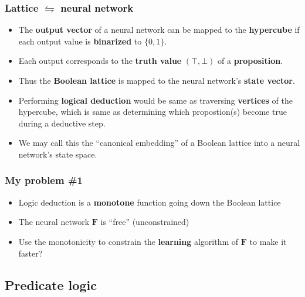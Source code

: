 \documentclass{beamer}
\newcommand{\vect}[1]{\boldsymbol{#1}}
\begin{document}
\begin{frame}
\frametitle{Lattice $\leftrightharpoons$ neural network}
\begin{itemize}
	\item The \textbf{output vector} of a neural network can be mapped to the \textbf{hypercube} if each output value is \textbf{binarized} to $\{0, 1\}$.  
	
	\item Each output corresponds to the \textbf{truth value} $(\top, \bot)$ of a \textbf{proposition}.  
	
	\item Thus the \textbf{Boolean lattice} is mapped to the neural network's \textbf{state vector}.
	
	\item Performing \textbf{logical deduction} would be same as traversing \textbf{vertices} of the hypercube, which is same as determining which propostion(s) become true during a deductive step.
	
	\item We may call this the ``canonical embedding'' of a Boolean lattice into a neural network's state space.
\end{itemize}
\end{frame}

\begin{frame}
\frametitle{My problem \#1}
\begin{itemize}
	\item Logic deduction is a \textbf{monotone} function going down the Boolean lattice
	\item The neural network $\vect{F}$ is ``free'' (unconstrained)
	\item Use the monotonicity to constrain the \textbf{learning} algorithm of $\vect{F}$ to make it faster?
\end{itemize}
\end{frame}

\subsection{Predicate logic}

\frame{\subsectionpage}
\end{document}

